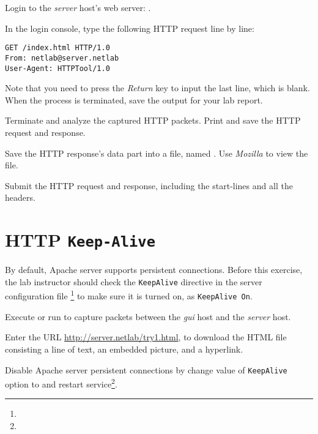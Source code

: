 \documentclass{../UTNetLab}
\begin{document}
    Login to the \textit{server} host’s web server: .

    In the login console, type the following HTTP request line by line:
    \begin{lstlisting}[language={HTTP},morekeywords={[2]GET,From,User-Agent},escapechar={},emph={server,netlab}]
GET /index.html HTTP/1.0
From: netlab@server.netlab
User-Agent: HTTPTool/1.0

    \end{lstlisting}
    Note that you need to press the \textit{Return} key to input the last line, which is blank.
    When the  process is terminated, save the output for your lab report.

    Terminate  and analyze the captured HTTP packets.
    Print and save the HTTP request and response.

    Save the HTTP response’s data part into a file, named .
    Use \textit{Mozilla} to view the file.

    \begin{report}
        \item Submit the HTTP request and response, including the start-lines and all the headers.
    \end{report}


\section{HTTP \texttt{Keep-Alive}}
    By default, Apache server supports persistent connections.
    Before this exercise, the lab instructor should check the \texttt{KeepAlive} directive in the server configuration file \footnote{} to make sure it is turned on, as \lstinline[language={HTTP}]{KeepAlive On}.

    Execute  or run  to capture packets between the \textit{gui} host and the \textit{server} host.


    Enter the URL \url{http://server.netlab/try1.html}, to download the HTML file consisting a line of text, an embedded picture, and a hyperlink.


    Disable Apache server persistent connections by change value of \texttt{KeepAlive} option to  and restart  service\footnote{}.
\end{document}
